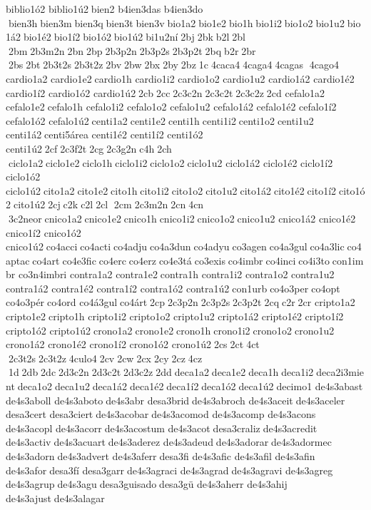 biblio1ó2 
biblio1ú2 bien2 
b4ien3das  	b4ien3do  bien3h bien3m bien3q bien3t bien3v bio1a2 bio1e2 bio1h bio1i2 bio1o2 bio1u2 bio1á2 bio1é2 bio1í2 bio1ó2 bio1ú2 bi1u2ní 2bj 2bk b2l 2bl  2bm 2b3m2n 2bn 2bp 2b3p2n 2b3p2s 2b3p2t 2bq b2r 2br  2bs 2bt 2b3t2s 2b3t2z 2bv 2bw 2bx 2by 2bz 1c 4caca4 4caga4 4cagas  4cago4 	cardio1a2 	cardio1e2 cardio1h 	cardio1i2 	cardio1o2 	cardio1u2 
cardio1á2 
cardio1é2 
cardio1í2 
cardio1ó2 
cardio1ú2 2cb 2cc 2c3c2n 2c3c2t 2c3c2z 2cd 	cefalo1a2 	cefalo1e2 cefalo1h 	cefalo1i2 	cefalo1o2 	cefalo1u2 
cefalo1á2 
cefalo1é2 
cefalo1í2 
cefalo1ó2 
cefalo1ú2 centi1a2 centi1e2 centi1h centi1i2 centi1o2 centi1u2 	centi1á2 centi5área 	centi1é2 	centi1í2 	centi1ó2 	centi1ú2 2cf 2c3f2t 2cg 2c3g2n c4h 2ch  ciclo1a2 ciclo1e2 ciclo1h ciclo1i2 ciclo1o2 ciclo1u2 	ciclo1á2 	ciclo1é2 	ciclo1í2 	ciclo1ó2 	ciclo1ú2 cito1a2 cito1e2 cito1h cito1i2 cito1o2 cito1u2 cito1á2 cito1é2 cito1í2 cito1ó2 cito1ú2 2cj c2k c2l 2cl  2cm 2c3m2n 2cn 4cn  3c2neor cnico1a2 cnico1e2 cnico1h cnico1i2 cnico1o2 cnico1u2 	cnico1á2 	cnico1é2 	cnico1í2 	cnico1ó2 	cnico1ú2 co4acci co4acti co4adju co4a3dun co4adyu co3agen co4a3gul co4a3lic co4aptac co4art co4e3fic co4erc co4erz co4e3tá co3exis co4imbr co4inci co4i3to con1imbr 
co3n4imbri 	contra1a2 	contra1e2 contra1h 	contra1i2 	contra1o2 	contra1u2 
contra1á2 
contra1é2 
contra1í2 
contra1ó2 
contra1ú2 con1urb co4o3per co4opt 	co4o3pér co4ord 	co4á3gul co4árt 2cp 2c3p2n 2c3p2s 2c3p2t 2cq c2r 2cr  	cripto1a2 	cripto1e2 cripto1h 	cripto1i2 	cripto1o2 	cripto1u2 
cripto1á2 
cripto1é2 
cripto1í2 
cripto1ó2 
cripto1ú2 crono1a2 crono1e2 crono1h crono1i2 crono1o2 crono1u2 	crono1á2 	crono1é2 	crono1í2 	crono1ó2 	crono1ú2 2cs 2ct 4ct  2c3t2s 2c3t2z 4culo4 2cv 2cw 2cx 2cy 2cz 4cz  1d 2db 2dc 2d3c2n 2d3c2t 2d3c2z 2dd deca1a2 deca1e2 deca1h deca1i2 deca2i3mient deca1o2 deca1u2 deca1á2 deca1é2 deca1í2 deca1ó2 deca1ú2 decimo1 
de4s3abast 
de4s3aboll 
de4s3aboto de4s3abr 	desa3brid de4s3abroch 
de4s3aceit de4s3aceler 	desa3cert 
desa3ciert de4s3acobar de4s3acomod 
de4s3acomp 
de4s3acons 
de4s3acopl 
de4s3acorr de4s3acostum 	de4s3acot desa3craliz de4s3acredit 
de4s3activ de4s3acuart de4s3aderez 
de4s3adeud de4s3adorar de4s3adormec 
de4s3adorn de4s3advert 
de4s3aferr desa3fi 	de4s3afic 	de4s3afil 	de4s3afin 	de4s3afor desa3fí 	desa3garr de4s3agraci 
de4s3agrad de4s3agravi 
de4s3agreg 
de4s3agrup de4s3agu desa3guisado desa3gü 
de4s3aherr 	de4s3ahij 
de4s3ajust de4s3alagar 
